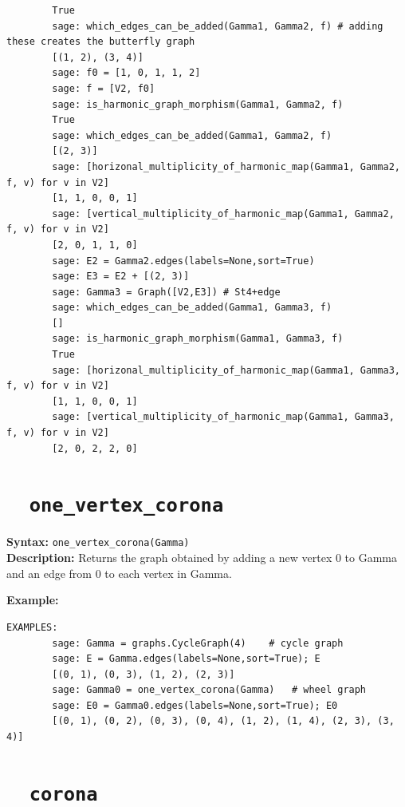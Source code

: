 \documentclass{article}
\begin{document}
\begin{verbatim}
        True
        sage: which_edges_can_be_added(Gamma1, Gamma2, f) # adding these creates the butterfly graph      
        [(1, 2), (3, 4)]
        sage: f0 = [1, 0, 1, 1, 2]                                                      
        sage: f = [V2, f0]                                                              
        sage: is_harmonic_graph_morphism(Gamma1, Gamma2, f)                             
        True
        sage: which_edges_can_be_added(Gamma1, Gamma2, f)                               
        [(2, 3)]
        sage: [horizonal_multiplicity_of_harmonic_map(Gamma1, Gamma2, f, v) for v in V2] 
        [1, 1, 0, 0, 1]
        sage: [vertical_multiplicity_of_harmonic_map(Gamma1, Gamma2, f, v) for v in V2] 
        [2, 0, 1, 1, 0]
        sage: E2 = Gamma2.edges(labels=None,sort=True)  
        sage: E3 = E2 + [(2, 3)] 
        sage: Gamma3 = Graph([V2,E3]) # St4+edge
        sage: which_edges_can_be_added(Gamma1, Gamma3, f) 
        []
        sage: is_harmonic_graph_morphism(Gamma1, Gamma3, f)
        True
        sage: [horizonal_multiplicity_of_harmonic_map(Gamma1, Gamma3, f, v) for v in V2]
        [1, 1, 0, 0, 1]
        sage: [vertical_multiplicity_of_harmonic_map(Gamma1, Gamma3, f, v) for v in V2]
        [2, 0, 2, 2, 0]
\end{verbatim}

\section{\tt \ \ one\_vertex\_corona}

\textbf{Syntax:} \verb}one_vertex_corona(Gamma)}\\

\textbf{Description:}
Returns the graph obtained by adding a new vertex 0 to Gamma and 
    an edge from 0 to each vertex in Gamma.

\textbf{Example:}
\begin{verbatim}
EXAMPLES:
        sage: Gamma = graphs.CycleGraph(4)    # cycle graph
        sage: E = Gamma.edges(labels=None,sort=True); E    
        [(0, 1), (0, 3), (1, 2), (2, 3)]
        sage: Gamma0 = one_vertex_corona(Gamma)   # wheel graph
        sage: E0 = Gamma0.edges(labels=None,sort=True); E0  
        [(0, 1), (0, 2), (0, 3), (0, 4), (1, 2), (1, 4), (2, 3), (3, 4)]
\end{verbatim}

\section{\tt \ \ corona}
\end{document}
